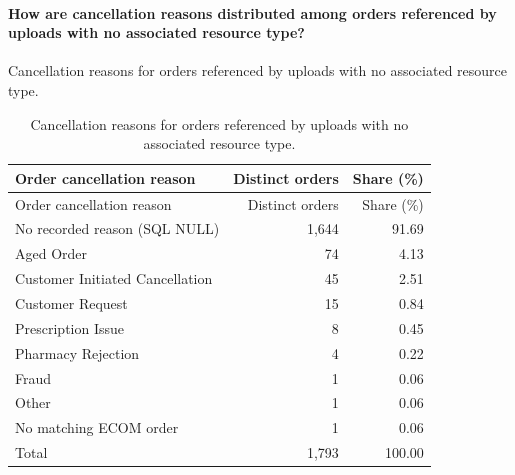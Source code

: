 \paragraph{How are cancellation reasons distributed among orders referenced by uploads with no associated resource type?}
Cancellation reasons for orders referenced by uploads with no associated resource type.

\begin{longtable}{@{}lrr@{}}
\caption{Cancellation reasons for orders referenced by uploads with no associated resource type.}
\label{tab:null-resource-upload-order-cancel-reasons}\\
\toprule
Order cancellation reason & Distinct orders & Share (\%) \\
\midrule
\endfirsthead
\toprule
Order cancellation reason & Distinct orders & Share (\%) \\
\midrule
\endhead

{No recorded reason (SQL NULL)} & 1,644 & 91.69 \\

{Aged Order} & 74 & 4.13 \\

{Customer Initiated Cancellation} & 45 & 2.51 \\

{Customer Request} & 15 & 0.84 \\

{Prescription Issue} & 8 & 0.45 \\

{Pharmacy Rejection} & 4 & 0.22 \\

{Fraud} & 1 & 0.06 \\

{Other} & 1 & 0.06 \\

{No matching ECOM order} & 1 & 0.06 \\
\midrule
Total & 1,793 & 100.00 \\
\bottomrule
\end{longtable}
